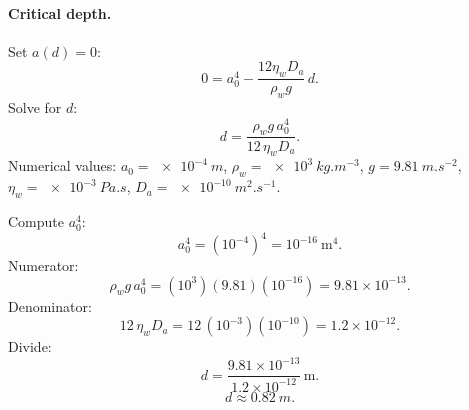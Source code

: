 \documentclass[11pt]{article}
\begin{document}
\paragraph{Critical depth.} Set $a(d)=0$:
\[ 0 = a_0^4 - \frac{12\eta_w D_a}{\rho_w g}\,d. \]
Solve for $d$:
\[ d = \frac{\rho_w g\,a_0^4}{12\,\eta_w D_a}. \]
Numerical values: $a_0=\SI{e-4}{m}$, $\rho_w=\SI{e3}{kg.m^{-3}}$, $g=\SI{9.81}{m.s^{-2}}$, $\eta_w=\SI{e-3}{Pa.s}$, $D_a=\SI{e-10}{m^2.s^{-1}}$.

Compute $a_0^4$:
\[ a_0^4 = (10^{-4})^4 = 10^{-16}\ \text{m}^4. \]
Numerator:
\[ \rho_w g\,a_0^4 = (10^3)(9.81)(10^{-16}) = 9.81\times 10^{-13}. \]
Denominator:
\[ 12\,\eta_w D_a = 12\,(10^{-3})(10^{-10}) = 1.2\times 10^{-12}. \]
Divide:
\[ d = \frac{9.81\times 10^{-13}}{1.2\times 10^{-12}}\,\text{m}. \]
\[ \boxed{\;d \approx \SI{0.82}{m}.\;} \]
\end{document}
